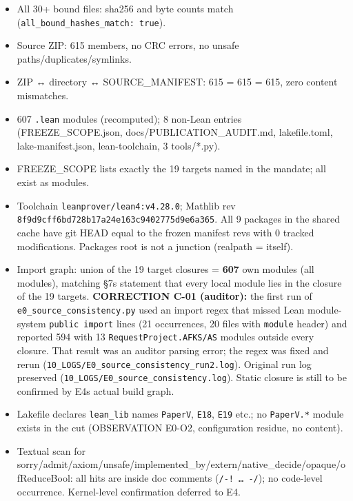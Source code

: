 \documentclass[
]{article}
\providecommand{\tightlist}{%
  \setlength{\itemsep}{0pt}\setlength{\parskip}{0pt}}
\begin{document}
\begin{itemize}
\tightlist
\item
  All 30+ bound files: sha256 and byte counts match
  (\texttt{all\_bound\_hashes\_match:\ true}).
\item
  Source ZIP: 615 members, no CRC errors, no unsafe
  paths/duplicates/symlinks.
\item
  ZIP ↔ directory ↔ SOURCE\_MANIFEST: 615 = 615 = 615, zero content
  mismatches.
\item
  607 \texttt{.lean} modules (recomputed); 8 non-Lean entries
  (FREEZE\_SCOPE.json, docs/PUBLICATION\_AUDIT.md, lakefile.toml,
  lake-manifest.json, lean-toolchain, 3 tools/*.py).
\item
  FREEZE\_SCOPE lists exactly the 19 targets named in the mandate; all
  exist as modules.
\item
  Toolchain \texttt{leanprover/lean4:v4.28.0}; Mathlib rev
  \texttt{8f9d9cff6bd728b17a24e163c9402775d9e6a365}. All 9 packages in
  the shared cache have git HEAD equal to the frozen manifest revs with
  0 tracked modifications. Packages root is not a junction (realpath =
  itself).
\item
  Import graph: union of the 19 target closures = \textbf{607} own
  modules (all modules), matching §7\textquotesingle s statement that
  every local module lies in the closure of the 19 targets.
  \textbf{CORRECTION C-01 (auditor):} the first run of
  \texttt{e0\_source\_consistency.py} used an import regex that missed
  Lean module-system \texttt{public\ import} lines (21 occurrences, 20
  files with \texttt{module} header) and reported 594 with 13
  \texttt{RequestProject.AFKS/AS} modules outside every closure. That
  result was an auditor parsing error; the regex was fixed and rerun
  (\texttt{10\_LOGS/E0\_source\_consistency\_run2.log}). Original run
  log preserved (\texttt{10\_LOGS/E0\_source\_consistency.log}). Static
  closure is still to be confirmed by E4\textquotesingle s actual build
  graph.
\item
  Lakefile declares \texttt{lean\_lib} names \texttt{PaperV},
  \texttt{E18}, \texttt{E19} etc.; no \texttt{PaperV.*} module exists in
  the cut (OBSERVATION E0-O2, configuration residue, no content).
\item
  Textual scan for
  sorry/admit/axiom/unsafe/implemented\_by/extern/native\_decide/opaque/ofReduceBool:
  all hits are inside doc comments (\texttt{/-!\ …\ -/}); no code-level
  occurrence. Kernel-level confirmation deferred to E4.
\end{itemize}
\end{document}
